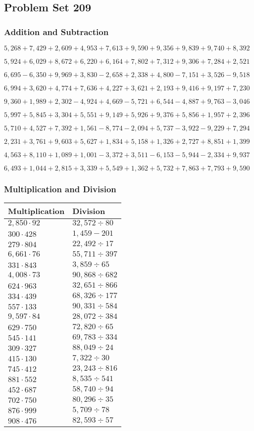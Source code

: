 \hypertarget{problem-set-209}{%
\subsection{Problem Set 209}\label{problem-set-209}}

\hypertarget{addition-and-subtraction}{%
\subsubsection{Addition and
Subtraction}\label{addition-and-subtraction}}

\(5,268+7,429+2,609+4,953+7,613+9,590+9,356+9,839+9,740+8,392\)

\(5,924+6,029+8,672+6,220+6,164+7,802+7,312+9,306+7,284+2,521\)

\(6,695-6,350+9,969+3,830-2,658+2,338+4,800-7,151+3,526-9,518\)

\(6,994+3,620+4,774+7,636+4,227+3,621+2,193+9,416+9,197+7,230\)

\(9,360+1,989+2,302-4,924+4,669-5,721+6,544-4,887+9,763-3,046\)

\(5,997+5,845+3,304+5,551+9,149+5,926+9,376+5,856+1,957+2,396\)

\(5,710+4,527+7,392+1,561-8,774-2,094+5,737-3,922-9,229+7,294\)

\(2,231+3,761+9,603+5,627+1,834+5,158+1,326+2,727+8,851+1,399\)

\(4,563+8,110+1,089+1,001-3,372+3,511-6,153-5,944-2,334+9,937\)

\(6,493+1,044+2,815+3,339+5,549+1,362+5,732+7,863+7,793+9,590\)

\hypertarget{multiplication-and-division}{%
\subsubsection{Multiplication and
Division}\label{multiplication-and-division}}

\begin{longtable}[]{@{}ll@{}}
\toprule
Multiplication & Division\tabularnewline
\midrule
\endhead
\(2,850\cdot92\) & \(32,572÷80\)\tabularnewline
\(300\cdot428\) & \(1,459-201\)\tabularnewline
\(279\cdot804\) & \(22,492÷17\)\tabularnewline
\(6,661\cdot76\) & \(55,711÷397\)\tabularnewline
\(331\cdot843\) & \(3,859÷65\)\tabularnewline
\(4,008\cdot73\) & \(90,868÷682\)\tabularnewline
\(624\cdot963\) & \(32,651÷866\)\tabularnewline
\(334\cdot439\) & \(68,326÷177\)\tabularnewline
\(557\cdot133\) & \(90,331÷584\)\tabularnewline
\(9,597\cdot84\) & \(28,072÷384\)\tabularnewline
\(629\cdot750\) & \(72,820÷65\)\tabularnewline
\(545\cdot141\) & \(69,783÷334\)\tabularnewline
\(309\cdot327\) & \(88,049÷24\)\tabularnewline
\(415\cdot130\) & \(7,322÷30\)\tabularnewline
\(745\cdot412\) & \(23,243÷816\)\tabularnewline
\(881\cdot552\) & \(8,535÷541\)\tabularnewline
\(452\cdot687\) & \(58,740÷94\)\tabularnewline
\(702\cdot750\) & \(80,296÷35\)\tabularnewline
\(876\cdot999\) & \(5,709÷78\)\tabularnewline
\(908\cdot476\) & \(82,593÷57\)\tabularnewline
\bottomrule
\end{longtable}
